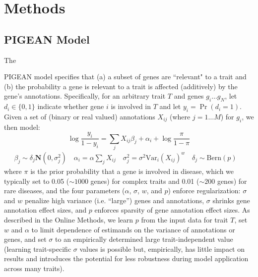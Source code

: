 \documentclass[sn-nature,lineno]{sn-jnl}%
\theoremstyle{thmstyleone}%
\theoremstyle{thmstyletwo}%
\theoremstyle{thmstylethree}%
\begin{document}
\newpage

 
\section{Methods}\label{sec:methods}

\subsection{PIGEAN Model}
\hypertarget{pigeanpior}{The} PIGEAN model specifies that (a) a subset of genes are ``relevant" to a trait and (b) the probability a gene is relevant to a trait is affected (additively) by the gene’s annotations. Specifically, for an arbitrary trait $T$ and genes $g_i\ldots g_N$, let $d_i \in\{0,1\}$ indicate whether gene $i$ is involved in $T$ and let $y_i=\Pr(d_i=1)$. Given a set of (binary or real valued) annotations $X_{ij}$ (where $j=1\dots M$) for $g_i$, we then model:
\[
\log\frac{y_i}{1-y_i} = \sum_j X_{ij}\beta_j + \alpha_i + \log\frac{\pi}{1-\pi} 
\]
\begin{align*}
\beta_j \sim \delta_j\mathbf{N}(0, \sigma_j^2) \quad
\alpha_i = \alpha\sum_j X_{ij} \quad
\sigma_j^2 = \sigma^2\text{Var}_i(X_{ij})^w \quad
\delta_j \sim \text{Bern}(p) \quad
\end{align*}
where $\pi$ is the prior probability that a gene is involved in disease, which we typically set to 0.05 ($\sim 1000$ genes) for complex traits and 0.01 ($\sim 200$ genes) for rare diseases, and the four parameters ($\alpha$, $\sigma$, $w$, and $p$) enforce regularization: $\sigma$ and $w$ penalize high variance (i.e. “large”) genes and annotations, $\sigma$ shrinks gene annotation effect sizes, and $p$ enforces sparsity of gene annotation effect sizes. As described in the Online Methods, we learn $p$ from the input data for trait $T$, set $w$ and $\alpha$ to limit dependence of estimands on the variance of annotations or genes, and set $\sigma$ to an empirically determined large trait-independent value (learning trait-specific $\sigma$ values is possible but, empirically, has little impact on results and introduces the potential for less robustness during model application across many traits).
\end{document}
